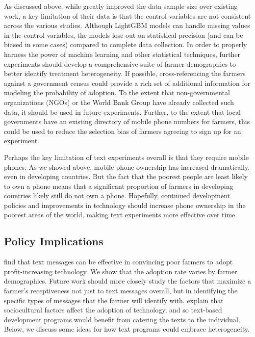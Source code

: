 \documentclass[12pt]{article}
\begin{document}
As discussed above, while \textcite{fabregas_digital_2025} greatly improved the data sample size over existing work, a key limitation of their data is that the control variables are not consistent across the various studies. Although LightGBM models can handle missing values in the control variables, the models lose out on statistical precision (and can be biased in some cases) compared to complete data collection. In order to properly harness the power of machine learning and other statistical techniques, further experiments should develop a comprehensive suite of farmer demographics to better identify treatment heterogeneity. If possible, cross-referencing the farmers against a government census could provide a rich set of additional information for modeling the probability of adoption. To the extent that non-governmental organizations (NGOs) or the World Bank Group have already collected such data, it should be used in future experiments. Further, to the extent that local governments have an existing directory of mobile phone numbers for farmers, this could be used to reduce the selection bias of farmers agreeing to sign up for an experiment.

Perhaps the key limitation of text experiments overall is that they require mobile phones. As we showed above, mobile phone ownership has increased dramatically, even in developing countries. But the fact that the poorest people are least likely to own a phone means that a significant proportion of farmers in developing countries likely still do not own a phone. Hopefully, continued development policies and improvements in technology should increase phone ownership in the poorest areas of the world, making text experiments more effective over time.

\subsection{Policy Implications}

\textcite{fabregas_digital_2025} find that text messages can be effective in convincing poor farmers to adopt profit-increasing technology. We show that the adoption rate varies by farmer demographics. Future work should more closely study the factors that maximize a farmer's receptiveness not just to text messages overall, but in identifying the specific types of messages that the farmer will identify with. \textcite{aker_promise_2016} explain that sociocultural factors affect the adoption of technology, and so text-based development programs would benefit from catering the texts to the individual. Below, we discuss some ideas for how text programs could embrace heterogeneity.
\end{document}
